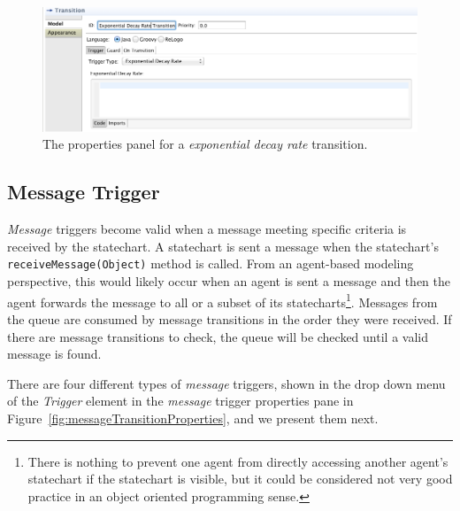 \documentclass[11pt]{amsart}
\begin{document}
\begin{figure}
\begin{center}
\vspace{.2in}
\centerline {
\includegraphics[width=5in]{StatechartsImages/ExponentialTransitionProperties.png}
}
\caption{The properties panel for a \emph{exponential decay rate} transition.}
\label{fig:exponentialTransitionProperties}
\end{center}
\end{figure}
\clearpage



\subsection{Message Trigger}
\label{sec:messageTransition}
\emph{Message} triggers become valid when a message meeting specific criteria is received by the statechart. A statechart is sent a message when the statechart's \texttt{receiveMessage(Object)} method is called. From an agent-based modeling perspective, this would likely occur when an agent is sent a message and then the agent forwards the message to all or a subset of its statecharts\footnote{There is nothing to prevent one agent from directly accessing another agent's statechart if the statechart is visible, but it could be considered not very good practice in an object oriented programming sense.}. Messages from the queue are consumed by message transitions in the order they were received. If there are message transitions to check, the queue will be checked until a valid message is found.

There are four different types of \emph{message} triggers, shown in the drop down menu of the \emph{Trigger} element in the \emph{message} trigger properties pane in Figure~\ref{fig:messageTransitionProperties}, and we present them next.
\end{document}
